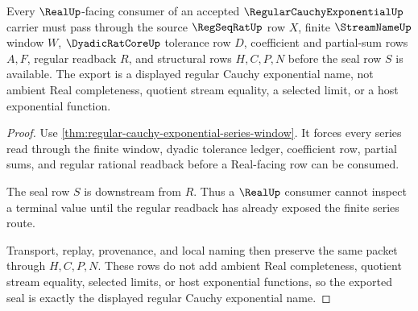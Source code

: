 \begin{theorem}
\label{thm:regular-cauchy-exponential-real-seal}
Every $\RealUp$-facing consumer of an accepted $\RegularCauchyExponentialUp$ carrier must pass through the source $\RegSeqRatUp$ row $X$, finite $\StreamNameUp$ window $W$, $\DyadicRatCoreUp$ tolerance row $D$, coefficient and partial-sum rows $A,F$, regular readback $R$, and structural rows $H,C,P,N$ before the seal row $S$ is available. The export is a displayed regular Cauchy exponential name, not ambient Real completeness, quotient stream equality, a selected limit, or a host exponential function.
\end{theorem}
\begin{proof}
Use \autoref{thm:regular-cauchy-exponential-series-window}. It forces every series read through the finite window, dyadic tolerance ledger, coefficient row, partial sums, and regular rational readback before a Real-facing row can be consumed.

The seal row $S$ is downstream from $R$. Thus a $\RealUp$ consumer cannot inspect a terminal value until the regular readback has already exposed the finite series route.

Transport, replay, provenance, and local naming then preserve the same packet through $H,C,P,N$. These rows do not add ambient Real completeness, quotient stream equality, selected limits, or host exponential functions, so the exported seal is exactly the displayed regular Cauchy exponential name.
\end{proof}


\begin{closurestatus}{\RegularCauchyExponentialUp}
  \theoryclosure{\seedClosure}
  \formalstatus{\unformalizedV}
\end{closurestatus}
